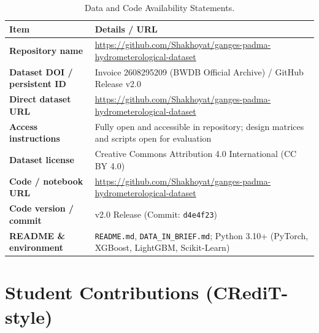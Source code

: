 \documentclass[11pt,a4paper]{article}
\begin{document}
\begin{table}[htbp]\centering\small
\caption{Data and Code Availability Statements.}
\label{tab:availability}
\begin{tabularx}{\linewidth}{|>{\bfseries}p{4.3cm}|X|}
\hline
\rowcolor{wordheadbg} \textbf{Item} & \textbf{Details / URL} \\ \hline
\cellcolor{wordkeybg}Repository name & \url{https://github.com/Shakhoyat/ganges-padma-hydrometerological-dataset} \\ \hline
\cellcolor{wordkeybg}Dataset DOI / persistent ID & Invoice 2608295209 (BWDB Official Archive) / GitHub Release v2.0 \\ \hline
\cellcolor{wordkeybg}Direct dataset URL & \url{https://github.com/Shakhoyat/ganges-padma-hydrometerological-dataset} \\ \hline
\cellcolor{wordkeybg}Access instructions & Fully open and accessible in repository; design matrices and scripts open for evaluation \\ \hline
\cellcolor{wordkeybg}Dataset license & Creative Commons Attribution 4.0 International (CC BY 4.0) \\ \hline
\cellcolor{wordkeybg}Code / notebook URL & \url{https://github.com/Shakhoyat/ganges-padma-hydrometerological-dataset} \\ \hline
\cellcolor{wordkeybg}Code version / commit & v2.0 Release (Commit: \texttt{d4e4f23}) \\ \hline
\cellcolor{wordkeybg}README \& environment & \texttt{README.md}, \texttt{DATA\_IN\_BRIEF.md}; Python 3.10+ (PyTorch, XGBoost, LightGBM, Scikit-Learn) \\ \hline
\end{tabularx}
\end{table}

\clearpage

\section{Student Contributions (CRediT-style)}
\end{document}
